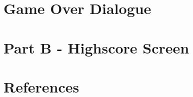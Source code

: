 \documentclass{article}
\begin{document}
\section{Game Over Dialogue}

\clearpage

\section{Part B - Highscore Screen}

\clearpage



\section{References}

\clearpage
\end{document}

